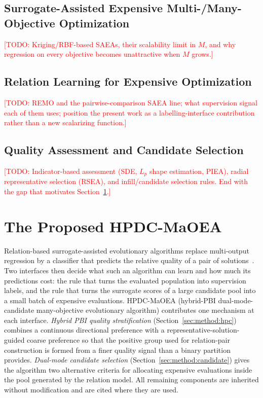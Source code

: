 \documentclass[final,5p,times,twocolumn]{elsarticle}
\newcommand{\TODO}[1]{\textcolor{red}{[TODO: #1]}}
\begin{document}
\subsection{Surrogate-Assisted Expensive Multi-/Many-Objective Optimization}
\label{sec:related:saea}
\TODO{Kriging/RBF-based SAEAs, their scalability limit in $M$, and why
regression on every objective becomes unattractive when $M$ grows.}

\subsection{Relation Learning for Expensive Optimization}
\label{sec:related:relation}
\TODO{REMO and the pairwise-comparison SAEA line; what supervision signal each
of them uses; position the present work as a labelling-interface contribution
rather than a new scalarizing function.}

\subsection{Quality Assessment and Candidate Selection}
\label{sec:related:selection}
\TODO{Indicator-based assessment (SDE, $L_p$ shape estimation, PIEA), radial
representative selection (RSEA), and infill/candidate selection rules. End with
the gap that motivates Section~\ref{sec:method}.}

\section{The Proposed HPDC-MaOEA}
\label{sec:method}

Relation-based surrogate-assisted evolutionary algorithms replace multi-output
regression by a classifier that predicts the relative quality of a pair of
solutions~\cite{ref:remo}. Two interfaces then decide what such an algorithm
can learn and how much its predictions cost: the rule that turns the evaluated
population into supervision labels, and the rule that turns the surrogate
scores of a large candidate pool into a small batch of expensive evaluations.
HPDC-MaOEA (hybrid-PBI dual-mode-candidate many-objective evolutionary
algorithm) contributes one mechanism at each interface. \emph{Hybrid PBI
quality stratification} (Section~\ref{sec:method:hpc}) combines a continuous
directional preference with a representative-solution-guided coarse preference
so that the positive group used for relation-pair construction is formed from a
finer quality signal than a binary partition provides. \emph{Dual-mode
candidate selection} (Section~\ref{sec:method:candidate}) gives the algorithm
two alternative criteria for allocating expensive evaluations inside the pool
generated by the relation model. All remaining components are inherited without
modification and are cited where they are used.
\end{document}
